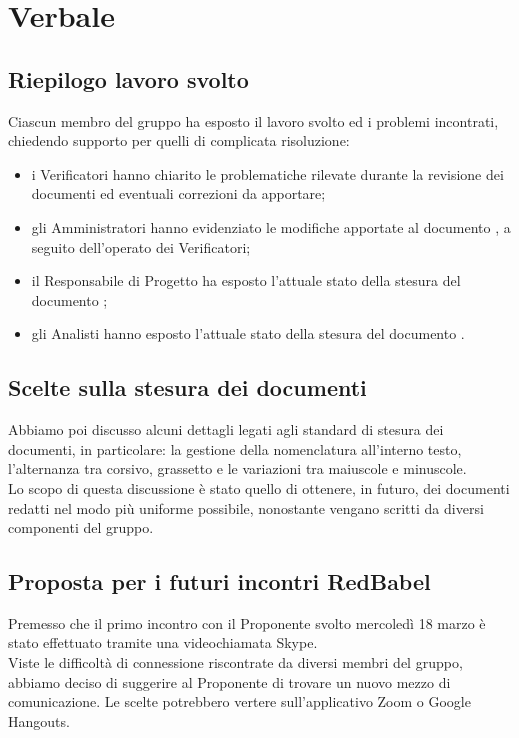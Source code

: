 \section{Verbale}
	
	\subsection{Riepilogo lavoro svolto}
		Ciascun membro del gruppo ha esposto il lavoro svolto ed i problemi incontrati, chiedendo supporto per quelli di complicata risoluzione:
		\begin{itemize}
			\item i Verificatori hanno chiarito le problematiche rilevate durante la revisione dei documenti ed eventuali correzioni da apportare;
			\item gli Amministratori hanno evidenziato le modifiche apportate al documento \NdP{}, a seguito dell'operato dei Verificatori;
			\item il Responsabile di Progetto ha esposto l'attuale stato della stesura del documento \PdP{};
			\item gli Analisti hanno esposto l'attuale stato della stesura del documento \AdR{}.
		\end{itemize}
		
		
	\subsection{Scelte sulla stesura dei documenti}
		Abbiamo poi discusso alcuni dettagli legati agli standard di stesura dei documenti, in particolare: la gestione della nomenclatura all'interno testo, l'alternanza tra corsivo, grassetto e le variazioni tra maiuscole e minuscole.\\
		Lo scopo di questa discussione è stato quello di ottenere, in futuro, dei documenti redatti nel modo più uniforme possibile, nonostante vengano scritti da diversi componenti del gruppo.
		
		
	\subsection{Proposta per i futuri incontri RedBabel}
		Premesso che il primo incontro con il Proponente svolto mercoledì 18 marzo è stato effettuato tramite una videochiamata Skype.\\
		Viste le difficoltà di connessione riscontrate da diversi membri del gruppo, abbiamo deciso di suggerire al Proponente di trovare un nuovo mezzo di comunicazione. Le scelte potrebbero vertere sull'applicativo Zoom o Google Hangouts.


